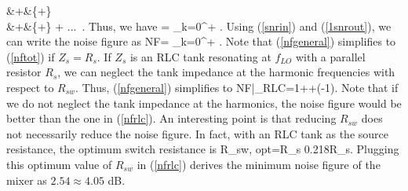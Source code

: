 &+&\left\{+\right\} \nonumber\\
&+&\left\{+\right\} + ...~.
\eer
Thus, we have
\beq
{}= 
\sum_{k=0}^{+\infty}  .
\label{1snrout}
\eeq
Using (\ref{snrin}) and (\ref{1snrout}), we can write the noise figure as
\beq
NF=
\sum_{k=0}^{+\infty}  .
\label{nfgeneral}
\eeq
Note that (\ref{nfgeneral}) simplifies to (\ref{nftot}) if $Z_s=R_s$. If $Z_s$ is an RLC tank resonating at $f_{LO}$ with a parallel resistor $R_s$, we
can neglect the tank impedance at the harmonic frequencies with respect to $R_{sw}$. Thus, (\ref{nfgeneral}) simplifies to 
\beq
NF|_{RLC}=1++(-1).
\label{nfrlc}
\eeq
Note that if we do not neglect the tank impedance at the harmonics, the noise figure would be better than the one in (\ref{nfrlc}).
An interesting point is that reducing $R_{sw}$ does not necessarily reduce the noise figure. In fact, with an RLC tank as the source resistance, the
optimum switch resistance is
\beq
R_{sw, opt}=R_s \approx 0.218R_s.
\label{rswopt}
\eeq
Plugging this optimum value of $R_{sw}$ in (\ref{nfrlc}) derives the minimum noise figure of the mixer as $2.54 \approx 4.05$ dB.



